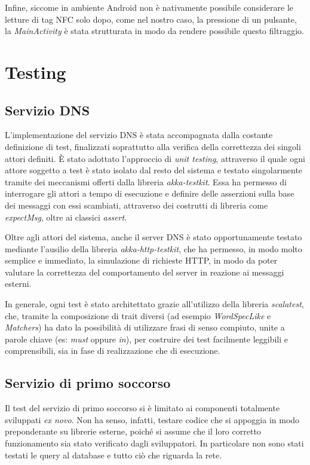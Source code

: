 \documentclass[a4paper,12pt]{report}
\begin{document}
Infine, siccome in ambiente Android non è nativamente possibile considerare le letture di tag NFC solo dopo, come nel nostro caso, la pressione di un pulsante, la \emph{MainActivity} è stata strutturata in modo da rendere possibile questo filtraggio.  

\chapter{Testing} 
\section{Servizio DNS}
L'implementazione del servizio DNS è stata accompagnata dalla costante definizione di test, finalizzati soprattutto alla verifica della correttezza dei singoli attori definiti. È stato adottato l'approccio di \emph{unit testing}, attraverso il quale ogni attore soggetto a test è stato isolato dal resto del sistema e testato singolarmente tramite dei meccanismi offerti dalla libreria \emph{akka-testkit}. Essa ha permesso di interrogare gli attori a tempo di esecuzione e definire delle asserzioni sulla base dei messaggi con essi scambiati, attraverso dei costrutti di libreria come \emph{expectMsg}, oltre ai classici \emph{assert}. 

Oltre agli attori del sistema, anche il server DNS è stato opportunamente testato mediante l'ausilio della libreria \emph{akka-http-testkit}, che ha permesso, in modo molto semplice e immediato, la simulazione di richieste HTTP, in modo da poter valutare la correttezza del comportamento del server in reazione ai messaggi esterni.

In generale, ogni test è stato architettato grazie all'utilizzo della libreria \emph{scalatest}, che, tramite la composizione di trait diversi (ad esempio \emph{WordSpecLike} e \emph{Matchers}) ha dato la possibilità di utilizzare frasi di senso compiuto, unite a parole chiave (es: \emph{must} oppure \emph{in}), per costruire dei test facilmente
leggibili e comprensibili, sia in fase di realizzazione che di esecuzione.

\section{Servizio di primo soccorso}
Il test del servizio di primo soccorso si è limitato ai componenti totalmente sviluppati \emph{ex novo}. Non ha senso, infatti, testare codice che si appoggia in modo preponderante su librerie esterne, poiché si assume che il loro corretto funzionamento sia stato verificato dagli sviluppatori. In particolare non sono stati testati le query al database e tutto ciò che riguarda la rete.
\end{document}
